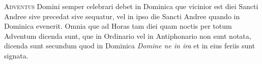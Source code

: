 \begin{multicols*}{2}
{\color{Red} }
\lettrine[lines=2]{\zallmancaps \color{Red} A}{dventus} Domini semper celebrari debet in Dominica que vicinior est diei Sancti Andree sive precedat sive sequatur, vel in ipso die Sancti Andree quando in Dominica evenerit.
Omnia que ad Horas tam diei quam noctis per totum Adventum dicenda sunt, que in Ordinario vel in Antiphonario non sunt notata, dicenda sunt secundum quod in Dominica \textit{Domine ne in ira} et in eius feriis sunt signata.

{\color{Red}}


{\color{Red}}



\end{multicols*}
